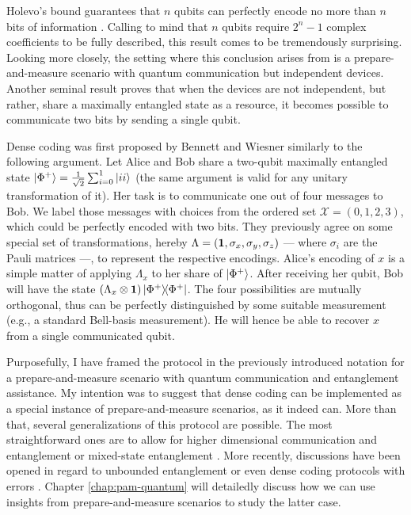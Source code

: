             Holevo's bound guarantees that $n$ qubits can perfectly encode no more than $n$ bits of information \cite{holevo-bound-1973}. Calling to mind that $n$ qubits require $2^n - 1$ complex coefficients to be fully described, this result comes to be tremendously surprising. Looking more closely, the setting where this conclusion arises from is a prepare-and-measure scenario with quantum communication but independent devices. Another seminal result proves that when the devices are not independent, but rather, share a maximally entangled state as a resource, it becomes possible to communicate two bits by sending a single qubit.

            Dense coding was first proposed by Bennett and Wiesner \cite{bennett_1992_superdense} similarly to the following argument. Let Alice and Bob share a two-qubit maximally entangled state $\ket{\Phi^+} = \frac{1}{\sqrt{2}} \sum_{i = 0}^{1} \ket{ii}$ (the same argument is valid for any unitary transformation of it). Her task is to communicate one out of four messages to Bob. We label those messages with choices from the ordered set $\mathcal{X} = (0, 1, 2, 3)$, which could be perfectly encoded with two bits. They previously agree on some special set of transformations, hereby $\Lambda = (\mathbf{1},\sigma_x, \sigma_y, \sigma_z)$ --- where $\sigma_i$ are the Pauli matrices ---, to represent the respective encodings. Alice's encoding of $x$ is a simple matter of applying $\Lambda_x$ to her share of $\ket{\Phi^+}$. After receiving her qubit, Bob will have the state $\left( \Lambda_x \otimes \mathbf{1} \right) \ketbra{\Phi^+}{\Phi^+}$. The four possibilities are mutually orthogonal, thus can be perfectly distinguished by some suitable measurement (e.g., a standard Bell-basis measurement). He will hence be able to recover $x$ from a single communicated qubit.
            
            Purposefully, I have framed the protocol in the previously introduced notation for a prepare-and-measure scenario with quantum communication and entanglement assistance. My intention was to suggest that dense coding can be implemented as a special instance of prepare-and-measure scenarios, as it indeed can. More than that, several generalizations of this protocol are possible. The most straightforward ones are to allow for higher dimensional communication and entanglement \cite{bennett_1992_superdense} or mixed-state entanglement \cite{barenco_dense_1995}. More recently, discussions have been opened in regard to unbounded entanglement \cite{tavakoli_eapam_2021} or even dense coding protocols with errors \cite{nayak_rigidity_2020,moreno_pamdense_2021}. Chapter \ref{chap:pam-quantum} will detailedly discuss how we can use insights from prepare-and-measure scenarios to study the latter case. 